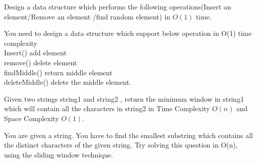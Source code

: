 {\begin{exercise}
\begin{compactenum}
\item Design a data structure which performs the following operations(Insert an element/Remove an element /find random element) in $O(1)$ time.
\item You need to design a data structure which support below operation in O(1) time complexity
    \\ Insert() add element
    \\ remove() delete element 
    \\ findMiddle()   return middle element
    \\ deleteMiddle() delete the middle element.

\item Given two strings string1 and string2 , return the minimum window in string1 which will contain all the characters in string2 in Time Complexity $O(n)$ and Space Complexity $O(1)$.
\item You are given a string. You have to find the smallest substring which contains all the distinct characters of the given string.
Try solving this question in O(n), using the sliding window technique.



\end{compactenum}

\end{exercise}
}